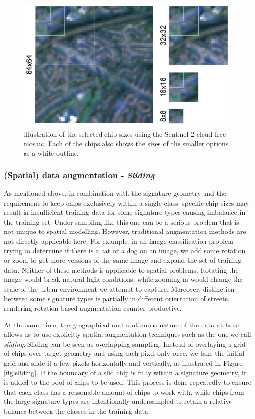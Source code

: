 \begin{figure}
    \centering
    \includegraphics[width=.8\linewidth]{fig/chips.png}
    \caption{Illustration of the selected chip sizes using the Sentinel 2 cloud-free mosaic. Each of the chips also shows the sizes of the smaller options as a white outline.}
    \label{fig:chips}
\end{figure}



\subsubsection{(Spatial) data augmentation - \textit{Sliding}}



As mentioned above, in combination with the signature geometry and
the requirement to keep chips exclusively within a single class, specific chip sizes may result in
insufficient training data for some signature types causing imbalance in the training set. Under-sampling like this
one can be a serious problem that is not unique to spatial modelling. However,
traditional augmentation methods are not directly applicable here. For example, in an
image classification problem trying to determine if there is a cat or a dog on an image,
we add some rotation or zoom to get more versions of
the same image and expand the set of training data. Neither of these methods is
applicable to spatial problems. Rotating the image would break
natural light conditions, while zooming in would change the scale of the urban environment
we attempt to capture. Moreover, distinction between some signature types is partially
in different orientation of streets, rendering rotation-based augmentation counter-productive.

At the same time, the geographical and continuous nature of the data at hand
allows us to use explicitly spatial augmentation techniques such as the one we
call \textit{sliding}.
Sliding can be seen as overlapping sampling. Instead of overlaying a grid of chips over
target geometry and using each pixel only once, we take the initial grid and slide it a
few pixels horizontally and vertically, as illustrated in Figure \ref{fig:sliding}. If
the boundary of a slid chip is fully within a signature geometry, it is added to the
pool of chips to be used. This process is done repeatedly to ensure that each class has
a reasonable amount of chips to work with, while chips from the large signature types
are intentionally undersampled to retain a relative balance between the classes in the training data.

